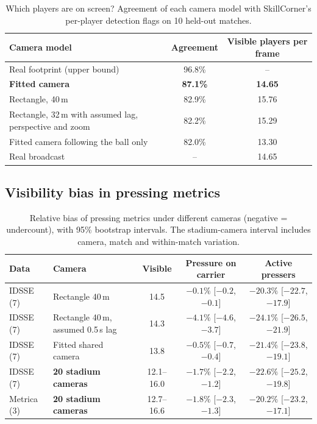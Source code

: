 \documentclass[11pt]{article}
\begin{document}
\begin{table}[t]
\centering
\caption{Which players are on screen? Agreement of each camera model with SkillCorner's per-player detection flags on
10 held-out matches.}
\label{tab:validation}
\begin{tabular}{lcc}
\toprule
Camera model & Agreement & Visible players per frame \\
\midrule
Real footprint (upper bound) & 96.8\% & -- \\
\textbf{Fitted camera} & \textbf{87.1\%} & \textbf{14.65} \\
Rectangle, 40\,m & 82.9\% & 15.76 \\
Rectangle, 32\,m with assumed lag, perspective and zoom & 82.2\% & 15.29 \\
Fitted camera following the ball only & 82.0\% & 13.30 \\
\midrule
Real broadcast & -- & 14.65 \\
\bottomrule
\end{tabular}
\end{table}

\subsection{Visibility bias in pressing metrics}

\begin{table}[t]
\centering
\caption{Relative bias of pressing metrics under different cameras (negative = undercount), with 95\% bootstrap
intervals. The stadium-camera interval includes camera, match and within-match variation.}
\label{tab:bias}
\small
\begin{tabular}{llccc}
\toprule
Data & Camera & Visible & Pressure on carrier & Active pressers \\
\midrule
IDSSE (7) & Rectangle 40\,m & 14.5 & $-0.1\%$ [$-0.2$, $-0.1$] & $-20.3\%$ [$-22.7$, $-17.9$] \\
IDSSE (7) & Rectangle 40\,m, assumed 0.5\,s lag & 14.3 & $-4.1\%$ [$-4.6$, $-3.7$] & $-24.1\%$ [$-26.5$, $-21.9$] \\
IDSSE (7) & Fitted shared camera & 13.8 & $-0.5\%$ [$-0.7$, $-0.4$] & $-21.4\%$ [$-23.8$, $-19.1$] \\
IDSSE (7) & \textbf{20 stadium cameras} & 12.1--16.0 & $\mathbf{-1.7\%}$ [$-2.2$, $-1.2$] & $\mathbf{-22.6\%}$ [$-25.2$, $-19.8$] \\
Metrica (3) & \textbf{20 stadium cameras} & 12.7--16.6 & $\mathbf{-1.8\%}$ [$-2.3$, $-1.3$] & $\mathbf{-20.2\%}$ [$-23.2$, $-17.1$] \\
\bottomrule
\end{tabular}
\end{table}
\end{document}
